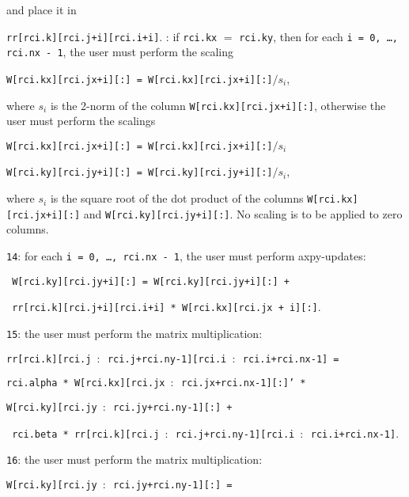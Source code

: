 \begin{description}
\begin{description}
and place it in 

\hspace{8mm}
{\tt rr[rci.k][rci.j+i][rci.i+i]}.
%
: 
if {\tt rci.kx} $=$ {\tt rci.ky}, then
for each
{\tt i = 0, \ldots, rci.nx - 1}, 
the user must perform the scaling

\hspace{8mm}
{\tt W[rci.kx][rci.jx+i][:] = W[rci.kx][rci.jx+i][:]$/s_i$},

where $s_i$ is the 2-norm of the column 
{\tt W[rci.kx][rci.jx+i][:]},
otherwise the user must perform the scalings

\hspace{8mm}
{\tt W[rci.kx][rci.jx+i][:] = W[rci.kx][rci.jx+i][:]$/s_i$}

\hspace{8mm}
{\tt W[rci.ky][rci.jy+i][:] = W[rci.ky][rci.jy+i][:]$/s_i$},

where $s_i$ is the square root of the dot product of 
the columns 
{\tt W[rci.kx][rci.jx+i][:]} and
{\tt W[rci.ky][rci.jy+i][:]}.
No scaling is to be applied to zero columns.
%
\item
{\tt 14}: 
for each {\tt i = 0, \ldots, rci.nx - 1}, 
the user must perform axpy-updates:

\hspace{8mm}
{\tt 
W[rci.ky][rci.jy+i][:] = 
W[rci.ky][rci.jy+i][:] + 
}

\hspace{12mm}
{\tt
rr[rci.k][rci.j+i][rci.i+i] * W[rci.kx][rci.jx + i][:]}.
%
\item
{\tt 15}: the user must perform the matrix multiplication:

\hspace{8mm}
{\tt rr[rci.k][rci.j $:$ rci.j+rci.ny-1][rci.i $:$ rci.i+rci.nx-1] =}

\hspace{12mm}
{\tt rci.alpha *
W[rci.kx][rci.jx $:$ rci.jx+rci.nx-1][:]' *}

\hspace{16mm}
{\tt W[rci.ky][rci.jy $:$ rci.jy+rci.ny-1][:] +}

\hspace{12mm}
{\tt 
rci.beta *
rr[rci.k][rci.j $:$ rci.j+rci.ny-1][rci.i $:$ rci.i+rci.nx-1]}.

%
\item
{\tt 16}: the user must perform the matrix multiplication:

\hspace{8mm}
{\tt W[rci.ky][rci.jy $:$ rci.jy+rci.ny-1][:] =}


\end{description}
\end{description}
